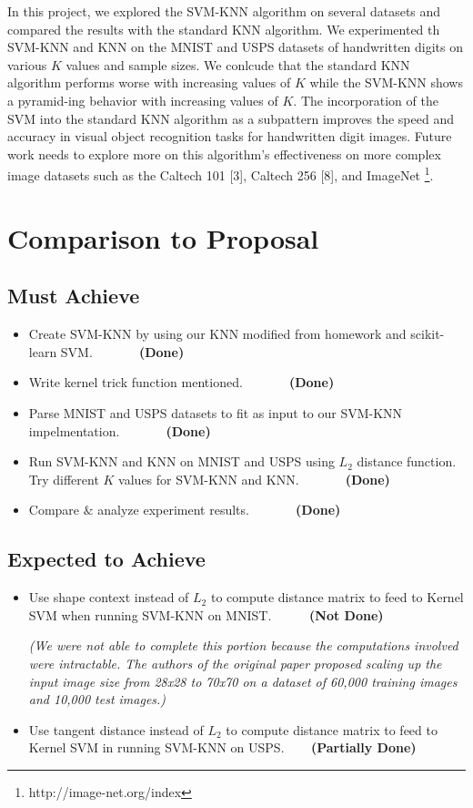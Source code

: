 \documentclass[11pt,letterpaper]{article}
\begin{document}
In this project, we explored the SVM-KNN algorithm on several datasets and compared the results with the standard KNN algorithm. We experimented th SVM-KNN and KNN on the MNIST and USPS datasets of handwritten digits on various $K$ values and sample sizes. We conlcude that the standard KNN algorithm performs worse with increasing values of $K$ while the SVM-KNN shows a pyramid-ing behavior with increasing values of $K$. The incorporation of the SVM into the standard KNN algorithm as a subpattern improves the speed and accuracy in visual object recognition tasks for handwritten digit images. Future work needs to explore more on this algorithm's effectiveness on more complex image datasets such as the Caltech 101 [3], Caltech 256 [8], and ImageNet \footnote{http://image-net.org/index}.

\section{Comparison to Proposal}

\subsection{Must Achieve}

\begin{itemize}
\item Create SVM-KNN by using our KNN modified from homework and scikit-learn SVM. $\>\>\>\>\>\>\>\>\>\>\>\>\>\>\>$\textbf{(Done)}
\item Write kernel trick function mentioned. $\>\>\>\>\>\>\>\>\>\>\>\>\>\>\>$\textbf{(Done)}
\item Parse MNIST and USPS datasets to fit as input to our SVM-KNN impelmentation. $\>\>\>\>\>\>\>\>\>\>\>\>\>\>\>$\textbf{(Done)}
\item Run SVM-KNN and KNN on MNIST and USPS using $L_2$ distance function. Try different $K$ values for SVM-KNN and KNN. $\>\>\>\>\>\>\>\>\>\>\>\>\>\>\>$\textbf{(Done)}
\item Compare $\&$ analyze experiment results. $\>\>\>\>\>\>\>\>\>\>\>\>\>\>\>$\textbf{(Done)}
\end{itemize}

\subsection{Expected to Achieve}
\begin{itemize}
\item Use shape context instead of $L_2$ to compute distance matrix to feed to Kernel SVM when running SVM-KNN on MNIST. $\>\>\>\>\>\>\>\>\>\>\>\>$\textbf{(Not Done)}

\textit{(We were not able to complete this portion because the computations involved were intractable. The authors of the original paper proposed scaling up the input image size from 28x28 to 70x70 on a dataset of 60,000 training images and 10,000 test images.)}
\item Use tangent distance instead of $L_2$ to compute distance matrix to feed to Kernel SVM in running SVM-KNN on USPS. $\>\>\>\>\>\>\>\>$\textbf{(Partially Done)}
\end{itemize}
\end{document}
